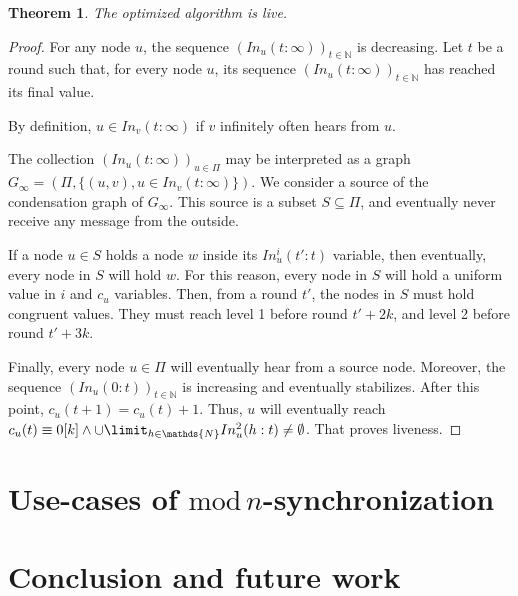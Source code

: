 \documentclass[11pt,letterpaper]{article}
\newtheorem{thm}{Theorem}
\begin{document}
\begin{thm}
	The optimized algorithm is live.
\end{thm}
\begin{proof}
	For any node $u$, the sequence $(In_u(t:\infty))_{t \in \mathds{N}}$ is decreasing.
	Let $t$ be a round such that, for every node $u$, its sequence $(In_u(t:\infty))_{t \in \mathds{N}}$ has reached its final value.

	By definition, $u \in In_v(t:\infty)$ if $v$ infinitely often hears from $u$.

	The collection $(In_u(t:\infty))_{u \in \Pi}$ may be interpreted as a graph $G_\infty = (\Pi, \{(u,v), u \in In_v(t:\infty)\})$.
	We consider a source of the condensation graph of $G_\infty$.
	This source is a subset $S \subseteq \Pi$, and eventually never receive any message from the outside.

	If a node $u \in S$ holds a node $w$ inside its $In_u^i(t':t)$ variable, then eventually, every node in $S$ will hold $w$.
	For this reason, every node in $S$ will hold a uniform value in $i$ and $c_u$ variables.
	Then, from a round $t'$, the nodes in $S$ must hold congruent values.
	They must reach level 1 before round $t'+2k$, and level 2 before round $t'+3k$.

	Finally, every node $u \in \Pi$ will eventually hear from a source node.
	Moreover, the sequence $(In_u(0:t))_{t \in \mathds{N}}$ is increasing and eventually stabilizes.
	After this point, $c_u(t+1) = c_u(t)+1$.
	Thus, $u$ will eventually reach $c_u(t) \equiv 0 [k] \wedge \cup\limit_{h \in \mathds{N}} In_u^2(h:t) \neq \emptyset$.
	That proves liveness.
\end{proof}

\section{Use-cases of $\mathrm{mod}\,n$-synchronization}

\section{Conclusion and future work}


\printbibliography
\end{document}
